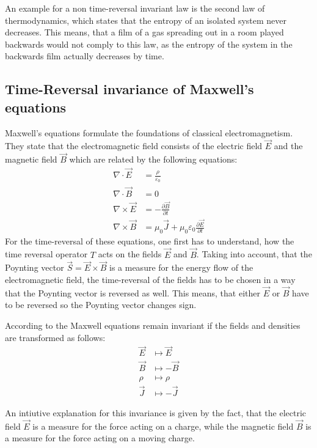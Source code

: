 An example for a non time-reversal invariant law is the second law of thermodynamics, which states that the entropy of an isolated system never decreases.
This means, that a film of a gas spreading out in a room played backwards would not comply to this law, as the entropy of the system in the backwards film actually decreases by time.

\subsection{Time-Reversal invariance of Maxwell's equations}
Maxwell's equations formulate the foundations of classical electromagnetism.
They state that the electromagnetic field consists of the electric field \(\vec{E}\) and the magnetic field \(\vec{B}\) which are related by the following equations:
\begin{align}
    \nabla \cdot \vec{E} &= \frac{\rho}{\varepsilon_0} \label{eq:maxwell1} \\
    \nabla \cdot \vec{B} &= 0 \label{eq:maxwell2} \\
    \nabla \times \vec{E} &= -\frac{\partial \vec{B}}{\partial t} \label{eq:maxwell3} \\
    \nabla \times \vec{B} &= \mu_0 \vec{J} + \mu_0 \varepsilon_0 \frac{\partial \vec{E}}{\partial t} \label{eq:maxwell4}
\end{align}
For the time-reversal of these equations, one first has to understand, how the time reversal operator \(T\) acts on the fields \(\vec{E}\) and \(\vec{B}\).
Taking into account, that the Poynting vector \(\vec{S} = \vec{E} \times \vec{B}\) is a measure for the energy flow of the electromagnetic field, the time-reversal of the fields has to be chosen in a way that the Poynting vector is reversed as well.
This means, that either \(\vec{E}\) or \(\vec{B}\) have to be reversed so the Poynting vector changes sign. 

According to \parencite{sigwarth_time_2022} the Maxwell equations remain invariant if the fields and densities are transformed as follows:
\begin{align}
    \vec{E} &\mapsto \vec{E} \\
    \vec{B} &\mapsto -\vec{B} \\
    \rho &\mapsto \rho \\
    \vec{J} &\mapsto -\vec{J}
\end{align}

An intiutive explanation for this invariance is given by the fact, that the electric field \(\vec{E}\) is a measure for the force acting on a charge, while the magnetic field \(\vec{B}\) is a measure for the force acting on a moving charge.   








